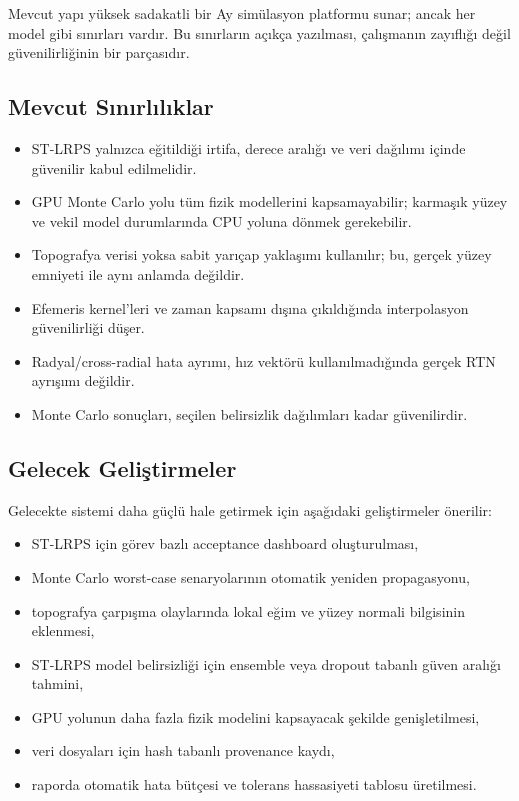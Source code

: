 Mevcut yapı yüksek sadakatli bir Ay simülasyon platformu sunar; ancak her model gibi sınırları vardır. Bu sınırların açıkça yazılması, çalışmanın zayıflığı değil güvenilirliğinin bir parçasıdır.

\subsection{Mevcut Sınırlılıklar}

\begin{itemize}
    \item ST-LRPS yalnızca eğitildiği irtifa, derece aralığı ve veri dağılımı içinde güvenilir kabul edilmelidir.
    \item GPU Monte Carlo yolu tüm fizik modellerini kapsamayabilir; karmaşık yüzey ve vekil model durumlarında CPU yoluna dönmek gerekebilir.
    \item Topografya verisi yoksa sabit yarıçap yaklaşımı kullanılır; bu, gerçek yüzey emniyeti ile aynı anlamda değildir.
    \item Efemeris kernel'leri ve zaman kapsamı dışına çıkıldığında interpolasyon güvenilirliği düşer.
    \item Radyal/cross-radial hata ayrımı, hız vektörü kullanılmadığında gerçek RTN ayrışımı değildir.
    \item Monte Carlo sonuçları, seçilen belirsizlik dağılımları kadar güvenilirdir.
\end{itemize}

\subsection{Gelecek Geliştirmeler}

Gelecekte sistemi daha güçlü hale getirmek için aşağıdaki geliştirmeler önerilir:
\begin{itemize}
    \item ST-LRPS için görev bazlı acceptance dashboard oluşturulması,
    \item Monte Carlo worst-case senaryolarının otomatik yeniden propagasyonu,
    \item topografya çarpışma olaylarında lokal eğim ve yüzey normali bilgisinin eklenmesi,
    \item ST-LRPS model belirsizliği için ensemble veya dropout tabanlı güven aralığı tahmini,
    \item GPU yolunun daha fazla fizik modelini kapsayacak şekilde genişletilmesi,
    \item veri dosyaları için hash tabanlı provenance kaydı,
    \item raporda otomatik hata bütçesi ve tolerans hassasiyeti tablosu üretilmesi.
\end{itemize}

